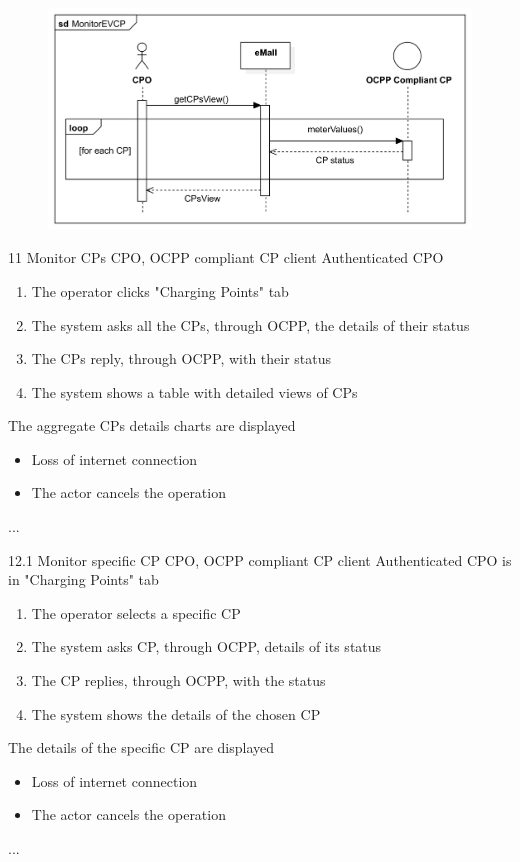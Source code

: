 \usecase
{
    \begin{figure}[H]
        \centering
        \includegraphics[scale=0.9]{src/sequence_diagram/monitorEVCP.png}
    \end{figure}
}
{11}
{Monitor CPs} %
{CPO, OCPP compliant CP client} %
{Authenticated CPO} %
{ %
    \begin{enumerate}
        \item The operator clicks "Charging Points" tab
        \item The system asks all the CPs, through OCPP, the details of their status
        \item The CPs reply, through OCPP, with their status
        \item The system shows a table with detailed views of CPs
    \end{enumerate}
}
{The aggregate CPs details charts are displayed} %
{ %
    \begin{itemize}
        \item Loss of internet connection
        \item The actor cancels the operation
    \end{itemize}
}
{ %
    ...
}

\usecase
{
    
}
{12.1}
{Monitor specific CP} %
{CPO, OCPP compliant CP client} %
{Authenticated CPO is in "Charging Points" tab} %
{ %
    \begin{enumerate}
        \item The operator selects a specific CP
        \item The system asks CP, through OCPP, details of its status
        \item The CP replies, through OCPP, with the status
        \item The system shows the details of the chosen CP
    \end{enumerate}
}
{The details of the specific CP are displayed} %
{ %
    \begin{itemize}
        \item Loss of internet connection
        \item The actor cancels the operation
    \end{itemize}
}
{ %
    ...
}

